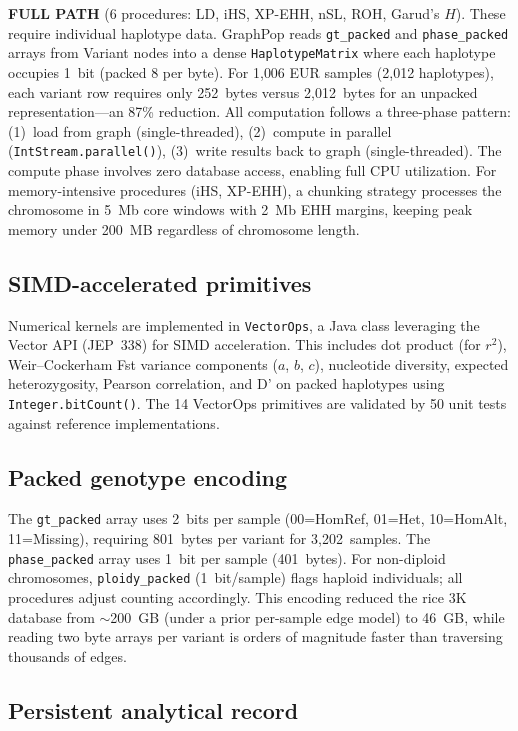 \textbf{FULL PATH} (6 procedures: LD, iHS, XP-EHH, nSL, ROH, Garud's $H$). These require individual haplotype data. GraphPop reads \texttt{gt\_packed} and \texttt{phase\_packed} arrays from Variant nodes into a dense \texttt{HaplotypeMatrix} where each haplotype occupies 1~bit (packed 8 per byte). For 1{,}006 EUR samples (2{,}012 haplotypes), each variant row requires only 252~bytes versus 2{,}012~bytes for an unpacked representation---an 87\% reduction. All computation follows a three-phase pattern: (1)~load from graph (single-threaded), (2)~compute in parallel (\texttt{IntStream.parallel()}), (3)~write results back to graph (single-threaded). The compute phase involves zero database access, enabling full CPU utilization. For memory-intensive procedures (iHS, XP-EHH), a chunking strategy processes the chromosome in 5~Mb core windows with 2~Mb EHH margins, keeping peak memory under 200~MB regardless of chromosome length.

\subsection*{SIMD-accelerated primitives}

Numerical kernels are implemented in \texttt{VectorOps}, a Java class leveraging the Vector API (JEP~338) for SIMD acceleration. This includes dot product (for $r^2$), Weir--Cockerham Fst variance components ($a$, $b$, $c$), nucleotide diversity, expected heterozygosity, Pearson correlation, and D' on packed haplotypes using \texttt{Integer.bitCount()}. The 14 VectorOps primitives are validated by 50 unit tests against reference implementations.

\subsection*{Packed genotype encoding}

The \texttt{gt\_packed} array uses 2~bits per sample (00=HomRef, 01=Het, 10=HomAlt, 11=Missing), requiring 801~bytes per variant for 3{,}202~samples. The \texttt{phase\_packed} array uses 1~bit per sample (401~bytes). For non-diploid chromosomes, \texttt{ploidy\_packed} (1~bit/sample) flags haploid individuals; all procedures adjust counting accordingly. This encoding reduced the rice 3K database from $\sim$200~GB (under a prior per-sample edge model) to 46~GB, while reading two byte arrays per variant is orders of magnitude faster than traversing thousands of edges.

\subsection*{Persistent analytical record}

